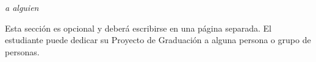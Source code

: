 \vspace*{0.4\textheight}
{\hfill{\Large{\emph{a alguien}}}}

Esta sección es opcional y deberá escribirse en una página separada. El 
estudiante puede dedicar su Proyecto de Graduación a alguna persona o 
grupo de personas.
